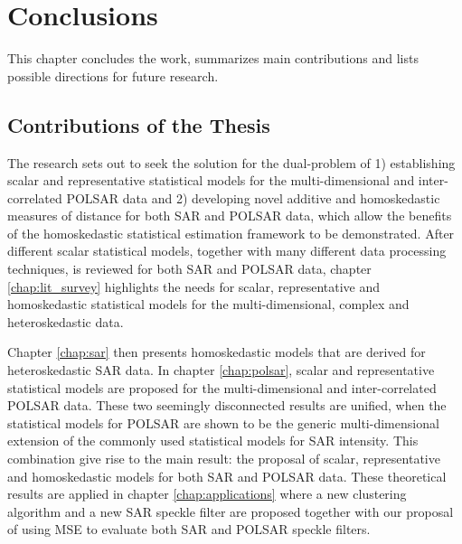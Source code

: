 \chapter{Conclusions} %
\label{chap:conclusions}



This chapter concludes the work, summarizes main contributions and lists possible directions for future research.


\section{Contributions of the Thesis}
\label{sec:conclusion_contribution}

The research sets out to seek the solution for the dual-problem of 
1) establishing scalar and representative statistical models for the multi-dimensional and inter-correlated POLSAR data 
and 
2) developing novel additive and homoskedastic measures of distance for both SAR and POLSAR data, which allow the benefits of the homoskedastic statistical estimation framework to be demonstrated. 
After different scalar statistical models, together with many different data processing techniques, is reviewed for both SAR and POLSAR data,
  chapter \ref{chap:lit_survey} highlights the needs for scalar, representative and homoskedastic statistical models for the multi-dimensional, complex and heteroskedastic data.

  Chapter \ref{chap:sar} then presents homoskedastic models that are derived for heteroskedastic SAR data. 
In chapter \ref{chap:polsar}, scalar and representative statistical models are proposed for the multi-dimensional and inter-correlated POLSAR data.
These two seemingly disconnected results are unified, when the statistical models for POLSAR are shown to be the generic multi-dimensional extension of the commonly used statistical models for SAR intensity.
This combination give rise to the main result: the proposal of scalar, representative and homoskedastic models for both SAR and POLSAR data.
These theoretical results are applied in chapter \ref{chap:applications} where a new clustering algorithm and a new SAR speckle filter are proposed together with our proposal of using MSE to evaluate both SAR and POLSAR speckle filters.

